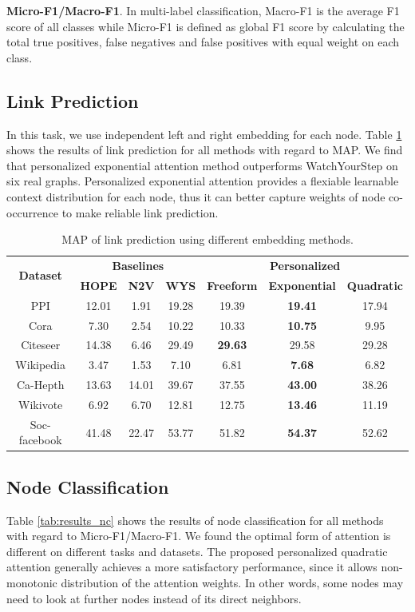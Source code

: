 \documentclass{article}
\begin{document}
\textbf{Micro-F1/Macro-F1}. In multi-label classification, Macro-F1 is the average F1 score of all classes while Micro-F1 is defined as global F1 score by calculating the total true positives, false negatives and false positives with equal weight on each class.



 
\subsection{Link Prediction}
In this task, we use independent left and right embedding for each node.
Table \ref{tab:results_lp} shows the results of link prediction for all methods with regard to MAP. We find that personalized exponential attention method outperforms WatchYourStep on six real graphs. Personalized exponential attention provides a flexiable learnable context distribution for each node, thus it can better capture weights of node co-occurrence to make reliable link prediction.
\begin{table}
\caption{MAP of link prediction using different embedding methods.}
\label{tab:results_lp}
\centering
\begin{tabular}{cccc|ccc}
\toprule
\multirow{2}{*}{\textbf{Dataset}} & \multicolumn{3}{c}{\textbf{Baselines}} & \multicolumn{3}{c}{\textbf{Personalized}} \\
 & \textbf{HOPE} & \textbf{N2V} & \textbf{WYS} & \textbf{Freeform} & \textbf{Exponential} & \textbf{Quadratic}\\
\midrule
PPI & 12.01  & 1.91 & 19.28 & 19.39 & \textbf{19.41} & 17.94\\
Cora & 7.30  & 2.54 & 10.22 & 10.33 & \textbf{10.75} & 9.95\\
Citeseer & 14.38  & 6.46  & 29.49 & \textbf{29.63} & 29.58 & 29.28 \\
Wikipedia & 3.47  & 1.53  & 7.10 & 6.81 & \textbf{7.68} & 6.82\\
Ca-Hepth & 13.63  & 14.01  & 39.67 & 37.55 & \textbf{43.00} & 38.26\\
Wikivote & 6.92  & 6.70  & 12.81 & 12.75 & \textbf{13.46} & 11.19\\
Soc-facebook & 41.48  & 22.47 & 53.77 & 51.82 & \textbf{54.37} & 52.62\\

\bottomrule
\end{tabular}
\end{table}


\subsection{Node Classification}
Table \ref{tab:results_nc} shows the results of node classification for all methods with regard to Micro-F1/Macro-F1.
We found the optimal form of attention is different on different tasks and datasets. The proposed personalized quadratic attention generally achieves a more satisfactory performance, since it allows non-monotonic distribution of the attention weights. In other words, some nodes may need to look at further nodes instead of its direct neighbors. 
\end{document}
